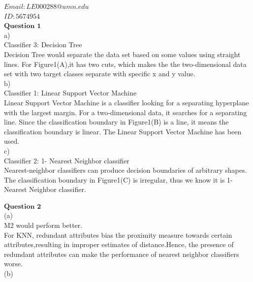 \documentclass[12pt]{article}
\begin{document}
$Email: LE000288@umn.edu$\\

$ID:5674954$\\

$\textbf{Question 1}$\\

a)\\

Classifier 3: Decision Tree\\

Decision Tree would separate the data set based on some values using straight lines. For Figure1(A),it has two cuts, which makes the the two-dimensional data set with two target classes separate with specific x and y value.\\

b)\\

Classifier 1: Linear Support Vector Machine\\

Linear Support Vector Machine is a classifier looking for a separating hyperplane with the largest margin. For a two-dimensional data, it searches for a separating line. Since the classification boundary in Figure1(B) is a line, it means the classification boundary is linear.   The Linear Support Vector Machine has been used.\\

c)\\

Classifier 2: 1- Nearest Neighbor classifier\\

Nearest-neighbor classifiers can produce decision boundaries of arbitrary shapes. The classification boundary in Figure1(C) is irregular, thus we know it is 1-Nearest Neighbor classifier.



\newpage

$\textbf{Question 2}$\\

(a)\\

M2 would perform better.\\

For KNN, redundant attributes bias the proximity
measure towards certain attributes,resulting in improper estimates of distance.Hence, the presence of redundant attributes can make the performance of nearest neighbor classifiers worse.\\

(b)\\
\end{document}
